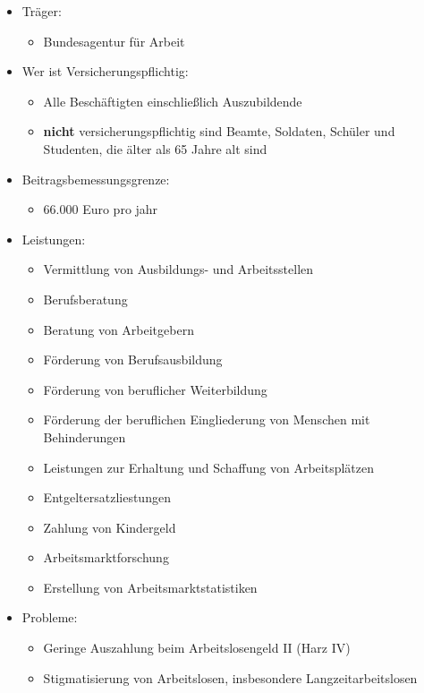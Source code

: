 \documentclass[a4paper, 12pt]{report}
\begin{document}
\begin{itemize}
    \item Träger:
        \begin{itemize}
            \item Bundesagentur für Arbeit
        \end{itemize}
    \item Wer ist Versicherungspflichtig:
        \begin{itemize}
            \item Alle Beschäftigten einschließlich Auszubildende
            \item \textbf{nicht} versicherungspflichtig sind Beamte, Soldaten, 
                Schüler und Studenten, die älter als 65 Jahre alt sind
        \end{itemize}
    \item Beitragsbemessungsgrenze:
        \begin{itemize}
            \item 66.000 Euro pro jahr
        \end{itemize}
    \item Leistungen:
        \begin{itemize}
            \item Vermittlung von Ausbildungs- und Arbeitsstellen
            \item Berufsberatung
            \item Beratung von Arbeitgebern
            \item Förderung von Berufsausbildung
            \item Förderung von beruflicher Weiterbildung
            \item Förderung der beruflichen Eingliederung von Menschen mit 
                Behinderungen
            \item Leistungen zur Erhaltung und Schaffung von Arbeitsplätzen
            \item Entgeltersatzliestungen
            \item Zahlung von Kindergeld
            \item Arbeitsmarktforschung 
            \item Erstellung von Arbeitsmarktstatistiken
        \end{itemize}
    \item Probleme: 
        \begin{itemize}
            \item Geringe Auszahlung beim Arbeitslosengeld II (Harz IV)
            \item Stigmatisierung von Arbeitslosen, insbesondere 
                Langzeitarbeitslosen
        \end{itemize}
\end{itemize}
\end{document}
